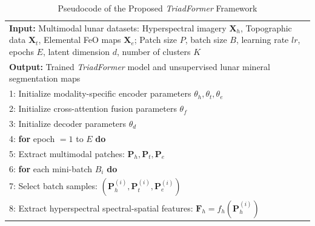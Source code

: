 \documentclass[pdflatex,sn-mathphys-num]{sn-jnl}
\begin{document}
\begin{table}[!t]
\centering
\caption{Pseudocode of the Proposed \textit{TriadFormer} Framework}
\label{alg:triadformer}

\renewcommand{\arraystretch}{1.12}

\begin{tabular}{p{}}

\hline

\textbf{Input:}
Multimodal lunar datasets:
Hyperspectral imagery $\mathbf{X}_{h}$,
Topographic data $\mathbf{X}_{t}$,
Elemental FeO maps $\mathbf{X}_{e}$;
Patch size $P$,
batch size $B$,
learning rate $lr$,
epochs $E$,
latent dimension $d$,
number of clusters $K$

\\

\textbf{Output:}
Trained \textit{TriadFormer} model and unsupervised lunar mineral segmentation maps

\\

\hline

1: Initialize modality-specific encoder parameters
$\theta_h,\theta_t,\theta_e$

\\

2: Initialize cross-attention fusion parameters
$\theta_f$

\\

3: Initialize decoder parameters
$\theta_d$

\\

4: \textbf{for} epoch $=1$ to $E$ \textbf{do}

\\

5: \hspace{0.5cm} Extract multimodal patches:
$\mathbf{P}_h,\mathbf{P}_t,\mathbf{P}_e$

\\

6: \hspace{0.5cm} \textbf{for} each mini-batch $B_i$ \textbf{do}

\\

7: \hspace{1cm} Select batch samples:
$(\mathbf{P}_h^{(i)},\mathbf{P}_t^{(i)},\mathbf{P}_e^{(i)})$

\\

8: \hspace{1cm} Extract hyperspectral spectral-spatial features:
$\mathbf{F}_h=f_h(\mathbf{P}_h^{(i)})$


\end{tabular}
\end{table}
\end{document}
